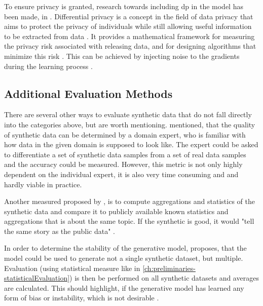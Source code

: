 To ensure privacy is granted, research towards including \gls{dp}\cite{dwork2008DifferentialPrivacySurvey} in the model has been made, \eg in \cite{xie2018DifferentiallyPrivateGenerative, jordon2018PATEGANGeneratingSynthetic, torfi2022DifferentiallyPrivateSynthetic}.
Differential privacy is a concept in the field of data privacy that aims to protect the privacy of individuals while still allowing useful information to be extracted from data \cite{dwork2008DifferentialPrivacySurvey}. 
It provides a mathematical framework for measuring the privacy risk associated with releasing data, and for designing algorithms that minimize this risk \cite{dwork2008DifferentialPrivacySurvey, zhao2022CTABGANEnhancingTabular}.
This can be achieved by injecting noise to the gradients during the learning process \cite{xie2018DifferentiallyPrivateGenerative}.

\subsection{Additional Evaluation Methods}
\label{ch:preliminaries-evaluationOfSyntheticTabularData-otherMetrics}

There are several other ways to evaluate synthetic data that do not fall directly into the categories above, but are worth mentioning.
\cite{elemam2020SevenWaysEvaluate} mentioned, that the quality of synthetic data can be determined by a domain expert, 
who is familiar with how data in the given domain is supposed to look like.
The expert could be asked to differentiate a set of synthetic data samples from a set of real data samples and the accuracy could be measured.
However, this metric is not only highly dependent on the individual expert, it is also very time consuming and and hardly viable in practice.

Another measured proposed by \cite{elemam2020SevenWaysEvaluate}, is to compute aggregations and statistics of the synthetic data and compare it to publicly available known statistics and aggregations that is about the same topic.
If the synthetic is good, it would "tell the same story as the public data" \cite[p. 58]{elemam2020SevenWaysEvaluate}.

In order to determine the stability of the generative model, \cite{elemam2020SevenWaysEvaluate} proposes, that the model could be used to generate not a single synthetic dataset, but multiple.
Evaluation (\eg using statistical measure like in \autoref{ch:preliminaries-statisticalEvaluation}) is then be performed on all synthetic datasets and averages are calculated.
This should highlight, if the generative model has learned any form of bias or instability, which is not desirable \cite{elemam2020SevenWaysEvaluate}.

